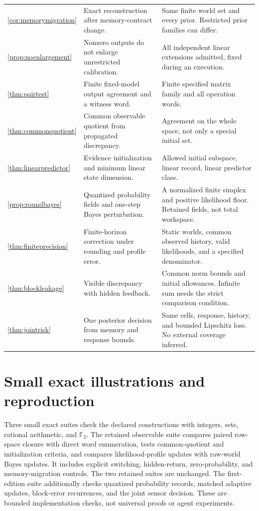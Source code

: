 \documentclass[11pt,letterpaper]{article}
\theoremstyle{plain}
\theoremstyle{definition}
\begin{document}
\begin{small}
\begin{longtable}{@{}P{.13\linewidth}P{.44\linewidth}P{.35\linewidth}@{}}
\ref{cor:memorymigration} & Exact reconstruction after memory-contract change. & Same finite world set and every prior. Restricted prior families can differ.\\
\ref{prop:noenlargement} & Nonzero outputs do not enlarge unrestricted calibration. & All independent linear extensions admitted, fixed during an execution.\\
\ref{thm:pairtest} & Finite fixed-model output agreement and a witness word. & Finite specified matrix family and all operation words.\\
\ref{thm:commonquotient} & Common observable quotient from propagated discrepancy. & Agreement on the whole space, not only a special initial set.\\
\ref{thm:linearpredictor} & Evidence initialization and minimum linear state dimension. & Allowed initial subspace, linear record, linear predictor class.\\
\ref{prop:roundbayes} & Quantized probability fields and one-step Bayes perturbation. & A normalized finite simplex and positive likelihood floor. Retained fields, not total workspace.\\
\ref{thm:finiteprecision} & Finite-horizon correction under rounding and profile error. & Static worlds, common observed history, valid likelihoods, and a specified denominator.\\
\ref{thm:blockleakage} & Visible discrepancy with hidden feedback. & Common norm bounds and initial allowances. Infinite sum needs the strict comparison condition.\\
\ref{thm:jointrisk} & One posterior decision from memory and response bounds. & Same cells, response, history, and bounded Lipschitz loss. No external coverage inferred.\\\bottomrule
\end{longtable}\end{small}

\clearpage
\section{Small exact illustrations and reproduction}\label{app:checks}
Three small exact suites check the declared constructions with integers, sets, rational arithmetic, and $\mathbb F_2$. The retained observable suite compares paired row-space closure with direct word enumeration, tests common-quotient and initialization criteria, and compares likelihood-profile updates with raw-world Bayes updates. It includes explicit switching, hidden-return, zero-probability, and memory-migration controls. The two retained suites are unchanged. The first-edition suite additionally checks quantized probability records, matched adaptive updates, block-error recurrences, and the joint sensor decision. These are bounded implementation checks, not universal proofs or agent experiments.
\end{document}
